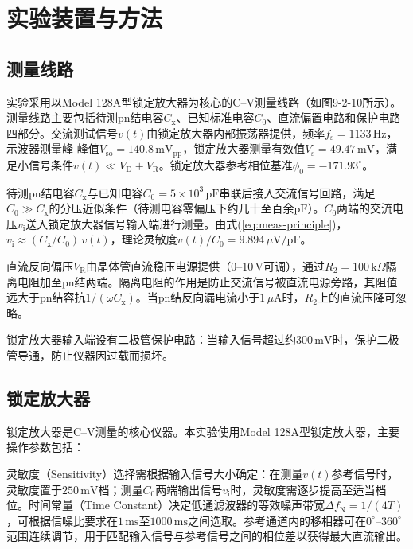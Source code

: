 \section{实验装置与方法}

\subsection{测量线路}

实验采用以Model 128A型锁定放大器为核心的C--V测量线路（如图9-2-10所示）。测量线路主要包括待测pn结电容$C_{\mathrm{x}}$、已知标准电容$C_{0}$、直流偏置电路和保护电路四部分。交流测试信号$v(t)$由锁定放大器内部振荡器提供，频率$f_{\mathrm{s}} = 1133\,\mathrm{Hz}$，示波器测量峰-峰值$V_{\mathrm{so}} = 140.8\,\mathrm{mV_{pp}}$，锁定放大器测量有效值$V_{\mathrm{s}} = 49.47\,\mathrm{mV}$，满足小信号条件$v(t) \ll V_{\mathrm{D}} + V_{\mathrm{R}}$。锁定放大器参考相位基准$\phi_{0} = -171.93^{\circ}$。

待测pn结电容$C_{\mathrm{x}}$与已知电容$C_{0} = 5 \times 10^{3}\,\mathrm{pF}$串联后接入交流信号回路，满足$C_{0} \gg C_{\mathrm{x}}$的分压近似条件（待测电容零偏压下约几十至百余$\mathrm{pF}$）。$C_{0}$两端的交流电压$v_{\mathrm{i}}$送入锁定放大器信号输入端进行测量。由式(\ref{eq:meas-principle})，$v_{\mathrm{i}} \approx (C_{\mathrm{x}}/C_{0})\,v(t)$，理论灵敏度$v(t)/C_{0} = 9.894\,\mu\mathrm{V/pF}$。

直流反向偏压$V_{\mathrm{R}}$由晶体管直流稳压电源提供（$0$--$10\,\mathrm{V}$可调），通过$R_{2} = 100\,\mathrm{k}\Omega$隔离电阻加至pn结两端。隔离电阻的作用是防止交流信号被直流电源旁路，其阻值远大于pn结容抗$1/(\omega C_{\mathrm{x}})$。当pn结反向漏电流小于$1\,\mu\mathrm{A}$时，$R_{2}$上的直流压降可忽略。

锁定放大器输入端设有二极管保护电路：当输入信号超过约$300\,\mathrm{mV}$时，保护二极管导通，防止仪器因过载而损坏。

\subsection{锁定放大器}

锁定放大器是C--V测量的核心仪器。本实验使用Model 128A型锁定放大器，主要操作参数包括：

灵敏度（Sensitivity）选择需根据输入信号大小确定：在测量$v(t)$参考信号时，灵敏度置于$250\,\mathrm{mV}$档；测量$C_{0}$两端输出信号$v_{\mathrm{i}}$时，灵敏度需逐步提高至适当档位。时间常量（Time Constant）决定低通滤波器的等效噪声带宽$\Delta f_{\mathrm{N}} = 1/(4T)$，可根据信噪比要求在$1\,\mathrm{ms}$至$1000\,\mathrm{ms}$之间选取。参考通道内的移相器可在$0^{\circ}$--$360^{\circ}$范围连续调节，用于匹配输入信号与参考信号之间的相位差以获得最大直流输出。

